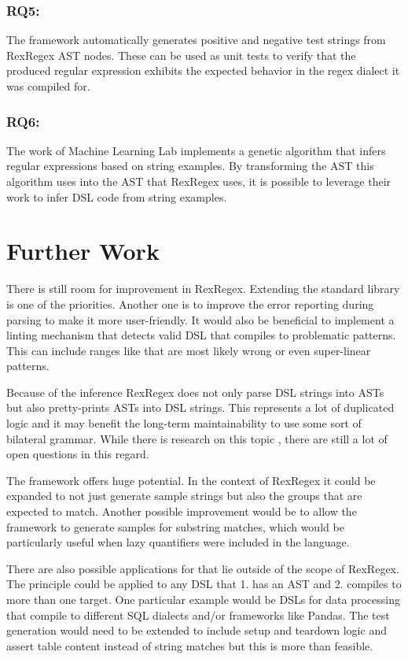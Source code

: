 \subsubsection{RQ5: \RQfive}

The \utgast{} framework automatically generates positive and negative test strings from RexRegex AST nodes. These can be used as unit tests to verify that the produced regular expression exhibits the expected behavior in the regex dialect it was compiled for.

\subsubsection{RQ6: \RQsix}

The work of Machine Learning Lab implements a genetic algorithm that infers regular expressions based on string examples. By transforming the AST this algorithm uses into the AST that RexRegex uses, it is possible to leverage their work to infer DSL code from string examples.

\section{Further Work}

There is still room for improvement in RexRegex. Extending the standard library is one of the priorities. Another one is to improve the error reporting during parsing to make it more user-friendly. It would also be beneficial to implement a linting mechanism that detects valid DSL that compiles to problematic patterns. This can include ranges like  that are most likely wrong or even super-linear patterns.

Because of the inference RexRegex does not only parse DSL strings into ASTs but also pretty-prints ASTs into DSL strings. This represents a lot of duplicated logic and it may benefit the long-term maintainability to use some sort of bilateral grammar. While there is research on this topic \cite{BidirectionalGrammarsForMachineCode}\cite{GuidedGrammarConvergence}, there are still a lot of open questions in this regard.

The \utgast{} framework offers huge potential. In the context of RexRegex it could be expanded to not just generate sample strings but also the groups that are expected to match. Another possible improvement would be to allow the framework to generate samples for substring matches, which would be particularly useful when lazy quantifiers were included in the language.

There are also possible applications for \utgast{} that lie outside of the scope of RexRegex. The principle could be applied to any DSL that 1. has an AST and 2. compiles to more than one target. One particular example would be DSLs for data processing that compile to different SQL dialects and/or frameworks like Pandas. The test generation would need to be extended to include setup and teardown logic and assert table content instead of string matches but this is more than feasible. 
